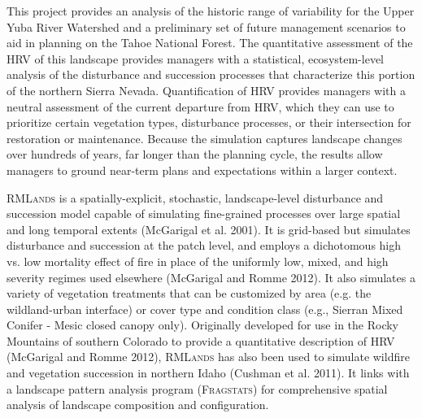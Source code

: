 This project provides an analysis of the historic range of variability for the Upper Yuba River Watershed and a preliminary set of future management scenarios to aid in planning on the Tahoe National Forest. The quantitative assessment of the HRV of this landscape provides managers with a statistical, ecosystem-level analysis of the disturbance and succession processes that characterize this portion of the northern Sierra Nevada. Quantification of HRV provides managers with a neutral assessment of the current departure from HRV, which they can use to prioritize certain vegetation types, disturbance processes, or their intersection for restoration or maintenance. Because the simulation captures landscape changes over hundreds of years, far longer than the planning cycle, the results allow managers to ground near-term plans and expectations within a larger context. 

\textsc{RMLands} is a spatially-explicit, stochastic, landscape-level disturbance and succession model capable of simulating fine-grained processes over large spatial and long temporal extents (McGarigal et al. 2001). It is grid-based but simulates disturbance and succession at the patch level, and employs a dichotomous high vs. low mortality effect of fire in place of the uniformly low, mixed, and high severity regimes used elsewhere (McGarigal and Romme 2012). It also simulates a variety of vegetation treatments that can be customized by area (e.g. the wildland-urban interface) or cover type and condition class (e.g., Sierran Mixed Conifer - Mesic closed canopy only). Originally developed for use in the Rocky Mountains of southern Colorado to provide a quantitative description of HRV (McGarigal and Romme 2012), \textsc{RMLands} has also been used to simulate wildfire and vegetation succession in northern Idaho (Cushman et al. 2011). It links with a landscape pattern analysis program (\textsc{Fragstats}) for comprehensive spatial analysis of landscape composition and configuration.  


